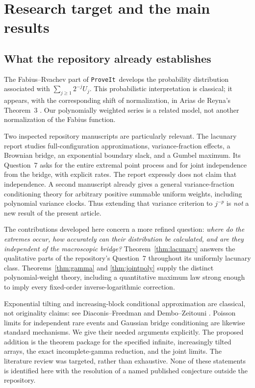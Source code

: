 \documentclass[11pt,a4paper]{article}
\numberwithin{equation}{section}
\theoremstyle{definition}
\theoremstyle{remark}
\newcommand{\repo}{\texttt{ProveIt}}
\begin{document}
\section{Research target and the main results}
\label{sec:intro}

\subsection{What the repository already establishes}
The Fabius--Rvachev part of \repo\ develops the probability distribution
associated with $\sum_{j\ge1}2^{-j}U_j$. This probabilistic interpretation
is classical; it appears, with the corresponding shift of normalization,
in Arias de Reyna's Theorem~3 \cite{arias}. Our polynomially weighted
series is a related model, not another normalization of the Fabius function.

Two inspected repository manuscripts are particularly relevant. The
lacunary report \cite{repolac} studies full-configuration approximations,
variance-fraction effects, a Brownian bridge, an exponential boundary
slack, and a Gumbel maximum. Its Question~7 asks for the entire extremal
point process and for joint independence from the bridge, with explicit
rates. The report expressly does not claim that independence. A second
manuscript \cite{repounif} already gives a general variance-fraction
conditioning theory for arbitrary positive summable uniform weights,
including polynomial variance clocks. Thus extending that variance
criterion to $j^{-p}$ is \emph{not} a new result of the present article.

The contributions developed here concern a more refined question:
\emph{where do the extremes occur, how accurately can their distribution
be calculated, and are they independent of the macroscopic bridge?}
Theorem~\ref{thm:lacunary} answers the qualitative parts of the repository's
Question~7 throughout its uniformly lacunary class.
Theorems~\ref{thm:gamma} and \ref{thm:jointpoly} supply the distinct
polynomial-weight theory, including a quantitative maximum law strong
enough to imply every fixed-order inverse-logarithmic correction.

Exponential tilting and increasing-block conditional approximation are
classical, not originality claims: see Diaconis--Freedman
\cite{df} and Dembo--Zeitouni \cite{dz}. Poisson limits for independent
rare events and Gaussian bridge conditioning are likewise standard
mechanisms. We give their needed arguments explicitly. The proposed
addition is the theorem package for the specified infinite, increasingly
tilted arrays, the exact incomplete-gamma reduction, and the joint limits.
The literature review was targeted, rather than exhaustive. None of these
statements is identified here with the resolution of a named published
conjecture outside the repository.
\end{document}
